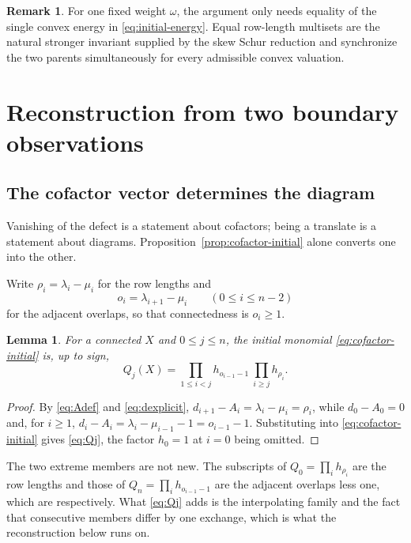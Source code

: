\documentclass[11pt,a4paper]{amsart}
\numberwithin{equation}{section}
\theoremstyle{plain}
\newtheorem{lemma}[theorem]{Lemma}
\theoremstyle{definition}
\newtheorem{remark}[theorem]{Remark}
\begin{document}
\begin{remark}
For one fixed weight \(\omega\), the argument only needs equality of the single convex energy in \eqref{eq:initial-energy}.  Equal row-length multisets are the natural stronger invariant supplied by the skew Schur reduction and synchronize the two parents simultaneously for every admissible convex valuation.
\end{remark}

\section{Reconstruction from two boundary observations}\label{sec:reconstruction}

\subsection{The cofactor vector determines the diagram}

Vanishing of the defect is a statement about cofactors; being a translate is a statement about diagrams.  Proposition~\ref{prop:cofactor-initial} alone converts one into the other.

Write \(\rho_i=\lambda_i-\mu_i\) for the row lengths and
\[
o_i=\lambda_{i+1}-\mu_i
\qquad(0\le i\le n-2)
\]
for the adjacent overlaps, so that connectedness is \(o_i\ge1\).

\begin{lemma}\label{lem:distinguished}
For a connected \(X\) and \(0\le j\le n\), the initial monomial \eqref{eq:cofactor-initial} is, up to sign,
\begin{equation}\label{eq:Qj}
Q_j(X)
=
\prod_{1\le i<j}h_{o_{i-1}-1}\ \prod_{i\ge j}h_{\rho_i}.
\end{equation}
\end{lemma}

\begin{proof}
By \eqref{eq:Adef} and \eqref{eq:dexplicit}, \(d_{i+1}-A_i=\lambda_i-\mu_i=\rho_i\), while \(d_0-A_0=0\) and, for \(i\ge1\), \(d_i-A_i=\lambda_i-\mu_{i-1}-1=o_{i-1}-1\).  Substituting into \eqref{eq:cofactor-initial} gives \eqref{eq:Qj}, the factor \(h_0=1\) at \(i=0\) being omitted.
\end{proof}

The two extreme members are not new.  The subscripts of \(Q_0=\prod_i h_{\rho_i}\) are the row lengths and those of \(Q_n=\prod_i h_{o_{i-1}-1}\) are the adjacent overlaps less one, which are \cite[Prop.~6.2(ii) and (iii)]{Reiner2007Coincidences} respectively.  What \eqref{eq:Qj} adds is the interpolating family and the fact that consecutive members differ by one exchange, which is what the reconstruction below runs on.
\end{document}
